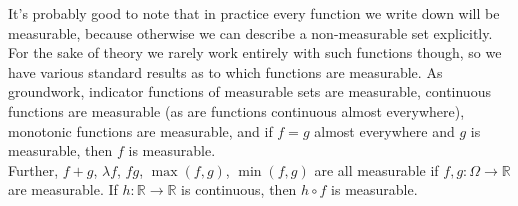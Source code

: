 \documentclass{tikzposter} %
\newtheorem{theorem}{Theorem}
\newtheorem{lemma}[theorem]{Lemma}
\newtheorem{definition}{Definition}
\begin{document}
\begin{columns}
{  It's probably good to note that in practice every function we write down will be measurable, because otherwise we can describe a non-measurable set explicitly. \\

  For the sake of theory we rarely work entirely with such functions though, so we have various standard results as to which functions are measurable. As groundwork, indicator functions of measurable sets are measurable, continuous functions are measurable (as are functions continuous almost everywhere), monotonic functions are measurable, and if $f = g$ almost everywhere and $g$ is measurable, then $f$ is measurable. \\

  Further, $f + g$, $\lambda f$, $fg$, $\max(f,g)$, $\min(f,g)$ are all measurable if $f, g : \Omega \to \mathbb{R}$ are measurable. If $h : \mathbb{R} \to \mathbb{R}$ is continuous, then $h \circ f$ is measurable.
  }

\end{columns}
\end{document}

